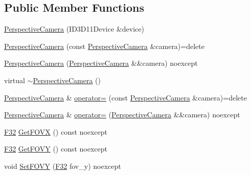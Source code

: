 \subsection*{Public Member Functions}
\begin{DoxyCompactItemize}
\item 
\mbox{\hyperlink{classmage_1_1rendering_1_1_perspective_camera_ab478643eb5a2285d330b228287cc0187}{Perspective\+Camera}} (I\+D3\+D11\+Device \&device)
\item 
\mbox{\hyperlink{classmage_1_1rendering_1_1_perspective_camera_ad4b54caa651462e68089436a8a1f8dc0}{Perspective\+Camera}} (const \mbox{\hyperlink{classmage_1_1rendering_1_1_perspective_camera}{Perspective\+Camera}} \&camera)=delete
\item 
\mbox{\hyperlink{classmage_1_1rendering_1_1_perspective_camera_a3d342252cefbffe69537e1ccc95a379a}{Perspective\+Camera}} (\mbox{\hyperlink{classmage_1_1rendering_1_1_perspective_camera}{Perspective\+Camera}} \&\&camera) noexcept
\item 
virtual \mbox{\hyperlink{classmage_1_1rendering_1_1_perspective_camera_ac9bc0faebd323ca26d0311e35612d219}{$\sim$\+Perspective\+Camera}} ()
\item 
\mbox{\hyperlink{classmage_1_1rendering_1_1_perspective_camera}{Perspective\+Camera}} \& \mbox{\hyperlink{classmage_1_1rendering_1_1_perspective_camera_ac9119d544f7ca6c4fbe1a6c5118bcd66}{operator=}} (const \mbox{\hyperlink{classmage_1_1rendering_1_1_perspective_camera}{Perspective\+Camera}} \&camera)=delete
\item 
\mbox{\hyperlink{classmage_1_1rendering_1_1_perspective_camera}{Perspective\+Camera}} \& \mbox{\hyperlink{classmage_1_1rendering_1_1_perspective_camera_ac5b98cb14cd16dffd1a46c4e52ef72a8}{operator=}} (\mbox{\hyperlink{classmage_1_1rendering_1_1_perspective_camera}{Perspective\+Camera}} \&\&camera) noexcept
\item 
\mbox{\hyperlink{namespacemage_aa97e833b45f06d60a0a9c4fc22ae02c0}{F32}} \mbox{\hyperlink{classmage_1_1rendering_1_1_perspective_camera_a3308ee4d7ec6830c04ed3f4fc01f81ac}{Get\+F\+O\+VX}} () const noexcept
\item 
\mbox{\hyperlink{namespacemage_aa97e833b45f06d60a0a9c4fc22ae02c0}{F32}} \mbox{\hyperlink{classmage_1_1rendering_1_1_perspective_camera_ae6be4458a427e626ec7299c5898ffd38}{Get\+F\+O\+VY}} () const noexcept
\item 
void \mbox{\hyperlink{classmage_1_1rendering_1_1_perspective_camera_ab9ae2a2ae24ff7934a31305a1a0decf7}{Set\+F\+O\+VY}} (\mbox{\hyperlink{namespacemage_aa97e833b45f06d60a0a9c4fc22ae02c0}{F32}} fov\+\_\+y) noexcept

\end{DoxyCompactItemize}
